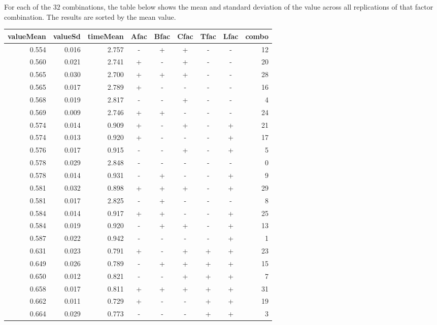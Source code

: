 \documentclass[11pt]{article}
\begin{document}
For each of the $32$ combinations, the table below shows the mean
and standard deviation of the value across all replications of that
factor combination.  The results are sorted by the mean value.

\begin{table}[ht]
\centering
\begin{tabular}{rrrcccccr}
  \hline
valueMean & valueSd & timeMean & Afac & Bfac & Cfac & Tfac & Lfac & combo \\ 
  \hline
0.554 & 0.016 & 2.757 & - & + & + & - & - & 12 \\ 
  0.560 & 0.021 & 2.741 & + & - & + & - & - & 20 \\ 
  0.565 & 0.030 & 2.700 & + & + & + & - & - & 28 \\ 
  0.565 & 0.017 & 2.789 & + & - & - & - & - & 16 \\ 
  0.568 & 0.019 & 2.817 & - & - & + & - & - & 4 \\ 
  0.569 & 0.009 & 2.746 & + & + & - & - & - & 24 \\ 
  0.574 & 0.014 & 0.909 & + & - & + & - & + & 21 \\ 
  0.574 & 0.013 & 0.920 & + & - & - & - & + & 17 \\ 
  0.576 & 0.017 & 0.915 & - & - & + & - & + & 5 \\ 
  0.578 & 0.029 & 2.848 & - & - & - & - & - & 0 \\ 
  0.578 & 0.014 & 0.931 & - & + & - & - & + & 9 \\ 
  0.581 & 0.032 & 0.898 & + & + & + & - & + & 29 \\ 
  0.581 & 0.017 & 2.825 & - & + & - & - & - & 8 \\ 
  0.584 & 0.014 & 0.917 & + & + & - & - & + & 25 \\ 
  0.584 & 0.019 & 0.920 & - & + & + & - & + & 13 \\ 
  0.587 & 0.022 & 0.942 & - & - & - & - & + & 1 \\ 
  0.631 & 0.023 & 0.791 & + & - & + & + & + & 23 \\ 
  0.649 & 0.026 & 0.789 & - & + & + & + & + & 15 \\ 
  0.650 & 0.012 & 0.821 & - & - & + & + & + & 7 \\ 
  0.658 & 0.017 & 0.811 & + & + & + & + & + & 31 \\ 
  0.662 & 0.011 & 0.729 & + & - & - & + & + & 19 \\ 
  0.664 & 0.029 & 0.773 & - & - & - & + & + & 3 \\ 

\end{tabular}
\end{table}
\end{document}
